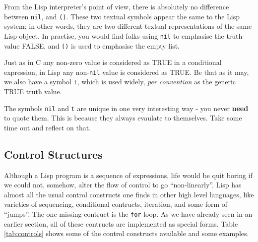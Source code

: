 \documentclass[10pt]{article}
\begin{document}
From the Lisp interpreter's point of view, there is absolutely no difference
between \texttt{nil}, and \texttt{()}.  These two textual symbols appear the
same to the Lisp system; in other words, they are two different textual
representations of the same Lisp object.  In practise, you would find folks
using \texttt{nil} to emphasise the truth value FALSE, and \texttt{()} is used
to emphasise the empty list.

Just as in C any non-zero value is considered as TRUE in a conditional
expression, in Lisp any non-\texttt{nil} value is considered as TRUE.  Be that
as it may, we also have a symbol \texttt{t}, which is used widely, \textit{per
  convention} as the generic TRUE truth value.

The symbols \texttt{nil} and \texttt{t} are unique in one very interesting way
- you never \textbf{need} to quote them.  This is because they always evaulate
to themselves.  Take some time out and reflect on that.

\subsection{Control Structures}

Although a Lisp program is a sequence of expressions, life would be quit boring
if we could not, somehow, alter the flow of control to go ``non-linearly''.
Lisp has almost all the usual control constructs one finds in other high level
languages, like varieties of sequencing, conditional contructs, iteration, and
some form of ``jumps''.  The one missing contruct is the \texttt{for} loop.  As
we have already seen in an earlier section, all of these contructs are
implemented as special forms.  Table \ref{tab:controls} shows some of the
control constructs available and some examples.
\end{document}
